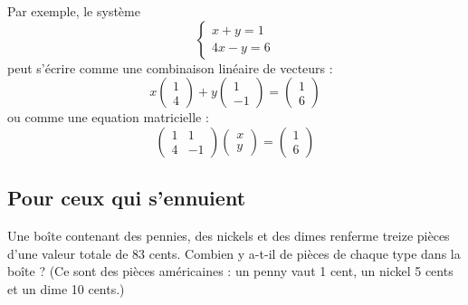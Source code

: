 \documentclass[11pt,a4paper]{report}
\begin{document}
Par exemple, le système 
$$\begin{cases}
  x + y = 1 \\
  4x - y = 6
\end{cases}$$
peut s'écrire comme une combinaison linéaire de vecteurs :
$$x\begin{pmatrix}1\\4\end{pmatrix} + y\begin{pmatrix}1\\-1\end{pmatrix} = \begin{pmatrix}1\\6\end{pmatrix}$$
ou comme une equation matricielle :
$$\begin{pmatrix}1&1\\4&-1\end{pmatrix}\begin{pmatrix}x\\y\end{pmatrix} = \begin{pmatrix}1\\6\end{pmatrix}$$

\vspace{2em}
\subsection{Pour ceux qui s'ennuient}
Une boîte contenant des pennies, des nickels et des dimes renferme treize pièces d'une valeur totale de 83 cents.
Combien y a-t-il de pièces de chaque type dans la boîte ?
(Ce sont des pièces américaines : un penny vaut 1 cent, un nickel 5 cents et un dime 10 cents.)
\end{document}

